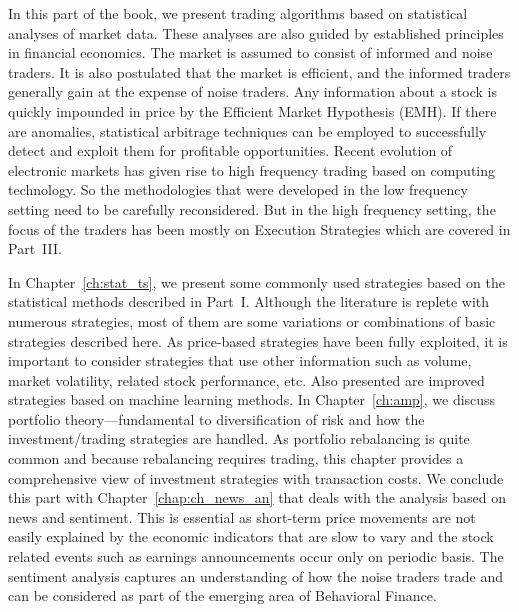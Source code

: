 
In this part of the book, we present trading algorithms based on statistical analyses of market data. These analyses are also guided by established principles in financial economics. The market is assumed to consist of informed and noise traders. It is also postulated that the market is efficient, and the informed traders generally gain at the expense of noise traders. Any information about a stock is quickly impounded in price by the Efficient Market Hypothesis (EMH). If there are anomalies, statistical arbitrage techniques can be employed to successfully detect and exploit them for profitable opportunities. Recent evolution of electronic markets has given rise to high frequency trading based on computing technology. So the methodologies that were developed in the low frequency setting need to be carefully reconsidered. But in the high frequency setting, the focus of the traders has been mostly on Execution Strategies which are covered in Part~III.


In Chapter~\ref{ch:stat_ts}, we present some commonly used strategies based on the statistical methods described in Part~I. Although the literature is replete with numerous strategies, most of them are some variations or combinations of basic strategies described here. As price-based strategies have been fully exploited, it is important to consider strategies that use other information such as volume, market volatility, related stock performance, etc. Also presented are improved strategies based on machine learning methods. In Chapter~\ref{ch:amp}, we discuss portfolio theory---fundamental to diversification of risk and how the investment/trading strategies are handled. As portfolio rebalancing is quite common and because rebalancing requires trading, this chapter provides a comprehensive view of investment strategies with transaction costs. We conclude this part with Chapter~\ref{chap:ch_news_an} that deals with the analysis based on news and sentiment. This is essential as short-term price movements are not easily explained by the economic indicators that are slow to vary and the stock related events such as earnings announcements occur only on periodic basis. The sentiment analysis captures an understanding of how the noise traders trade and can be considered as part of the emerging area of Behavioral Finance. 